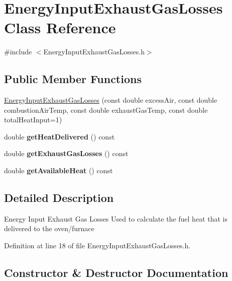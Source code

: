 \hypertarget{class_energy_input_exhaust_gas_losses}{}\section{Energy\+Input\+Exhaust\+Gas\+Losses Class Reference}
\label{class_energy_input_exhaust_gas_losses}


{\ttfamily \#include $<$Energy\+Input\+Exhaust\+Gas\+Losses.\+h$>$}

\subsection*{Public Member Functions}
\begin{DoxyCompactItemize}
\item 
\hyperlink{class_energy_input_exhaust_gas_losses_ab61da88b40504e71d2907ed8d997df85}{Energy\+Input\+Exhaust\+Gas\+Losses} (const double excess\+Air, const double combustion\+Air\+Temp, const double exhaust\+Gas\+Temp, const double total\+Heat\+Input=1)
\item 
\mbox{\label{class_energy_input_exhaust_gas_losses_a139f89d11cb663632ee9ccc27e242b07}} 
double {\bfseries get\+Heat\+Delivered} () const
\item 
\mbox{\label{class_energy_input_exhaust_gas_losses_aff089e129d329769d895e489928eb059}} 
double {\bfseries get\+Exhaust\+Gas\+Losses} () const
\item 
\mbox{\label{class_energy_input_exhaust_gas_losses_ac1e7691e1b6ce514d242faf806590179}} 
double {\bfseries get\+Available\+Heat} () const
\end{DoxyCompactItemize}


\subsection{Detailed Description}
Energy Input Exhaust Gas Losses Used to calculate the fuel heat that is delivered to the oven/furnace 

Definition at line 18 of file Energy\+Input\+Exhaust\+Gas\+Losses.\+h.



\subsection{Constructor \& Destructor Documentation}
\mbox{\label{class_energy_input_exhaust_gas_losses_ab61da88b40504e71d2907ed8d997df85}} 
